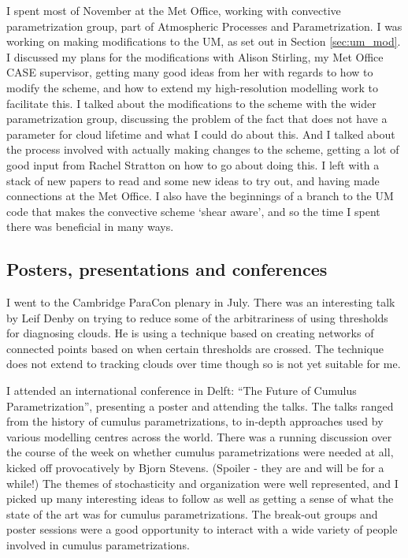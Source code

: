 \documentclass[11pt,a4paper]{article}
\begin{document}
I spent most of November at the Met Office, working with convective parametrization group, part of Atmospheric Processes and Parametrization. I was working on making modifications to the UM, as set out in Section \ref{sec:um_mod}. I discussed my plans for the modifications with Alison Stirling, my Met Office CASE supervisor, getting many good ideas from her with regards to how to modify the scheme, and how to extend my high-resolution modelling work to facilitate this. I talked about the modifications to the scheme with the wider parametrization group, discussing the problem of the fact that \cite{gregory1990mass} does not have a parameter for cloud lifetime and what I could do about this. And I talked about the process involved with actually making changes to the scheme, getting a lot of good input from Rachel Stratton on how to go about doing this. I left with a stack of new papers to read and some new ideas to try out, and having made connections at the Met Office. I also have the beginnings of a branch to the UM code that makes the convective scheme `shear aware', and so the time I spent there was beneficial in many ways.

\subsection{Posters, presentations and conferences}
\label{sec:presentations}
I went to the Cambridge ParaCon plenary in July. There was an interesting talk by Leif Denby on trying to reduce some of the arbitrariness of using thresholds for diagnosing clouds. He is using a technique based on creating networks of connected points based on when certain thresholds are crossed. The technique does not extend to tracking clouds over time though so is not yet suitable for me. 

I attended an international conference in Delft: ``The Future of Cumulus Parametrization'', presenting a poster and attending the talks. The talks ranged from the history of cumulus parametrizations, to in-depth approaches used by various modelling centres across the world. There was a running discussion over the course of the week on whether cumulus parametrizations were needed at all, kicked off provocatively by Bjorn Stevens. (Spoiler - they are and will be for a while!) The themes of stochasticity and organization were well represented, and I picked up many interesting ideas to follow as well as getting a sense of what the state of the art was for cumulus parametrizations. The break-out groups and poster sessions were a good opportunity to interact with a wide variety of people involved in cumulus parametrizations.
\end{document}

